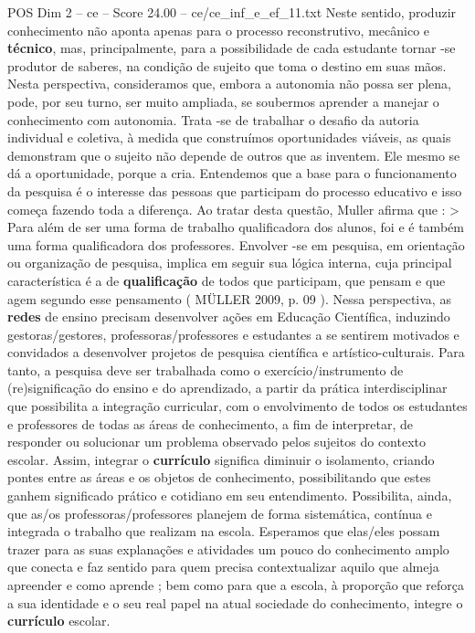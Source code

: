 \begin{textsample}{POS Dim 2 – ce – Score 24.00 – ce/ce\_inf\_e\_ef\_11.txt}
Neste sentido, produzir conhecimento não aponta apenas para o processo reconstrutivo, mecânico e \textbf{técnico}, mas, principalmente, para a possibilidade de cada estudante tornar -se produtor de saberes, na condição de sujeito que toma o destino em suas mãos.
Nesta perspectiva, consideramos que, embora a autonomia não possa ser plena, pode, por seu turno, ser muito ampliada, se soubermos aprender a manejar o conhecimento com autonomia.
Trata -se de trabalhar o desafio da autoria individual e coletiva, à medida que construímos oportunidades viáveis, as quais demonstram que o sujeito não depende de outros que as inventem.
Ele mesmo se dá a oportunidade, porque a cria.
Entendemos que a base para o funcionamento da pesquisa é o interesse das pessoas que participam do processo educativo e isso começa fazendo toda a diferença.
Ao tratar desta questão, Muller afirma que : > Para além de ser uma forma de trabalho qualificadora dos alunos, foi e é também uma forma qualificadora dos professores.
Envolver -se em pesquisa, em orientação ou organização de pesquisa, implica em seguir sua lógica interna, cuja principal característica é a de \textbf{qualificação} de todos que participam, que pensam e que agem segundo esse pensamento ( MÜLLER 2009, p. 09 ).
Nessa perspectiva, as \textbf{redes} de ensino precisam desenvolver ações em Educação Científica, induzindo gestoras/gestores, professoras/professores e estudantes a se sentirem motivados e convidados a desenvolver projetos de pesquisa científica e artístico-culturais.
Para tanto, a pesquisa deve ser trabalhada como o exercício/instrumento de (re)significação do ensino e do aprendizado, a partir da prática interdisciplinar que possibilita a integração curricular, com o envolvimento de todos os estudantes e professores de todas as áreas de conhecimento, a fim de interpretar, de responder ou solucionar um problema observado pelos sujeitos do contexto escolar.
Assim, integrar o \textbf{currículo} significa diminuir o isolamento, criando pontes entre as áreas e os objetos de conhecimento, possibilitando que estes ganhem significado prático e cotidiano em seu entendimento.
Possibilita, ainda, que as/os professoras/professores planejem de forma sistemática, contínua e integrada o trabalho que realizam na escola.
Esperamos que elas/eles possam trazer para as suas explanações e atividades um pouco do conhecimento amplo que conecta e faz sentido para quem precisa contextualizar aquilo que almeja apreender e como aprende ; bem como para que a escola, à proporção que reforça a sua identidade e o seu real papel na atual sociedade do conhecimento, integre o \textbf{currículo} escolar.

\end{textsample}

